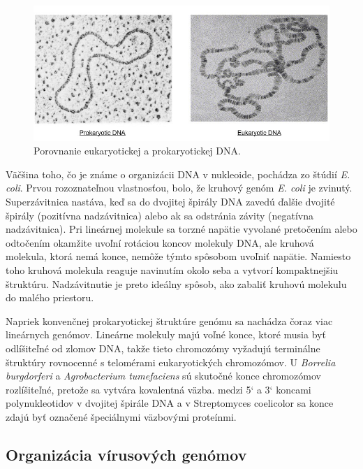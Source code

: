 \begin{figure}[!ht]
	\centering
	\includegraphics[width=\textwidth]{figures/pro-vs-eu-dna_med.jpeg}
	\caption{Porovnanie eukaryotickej a prokaryotickej DNA.\label{o:latex_friendly_zone}}
\end{figure}

Väčšina toho, čo je známe o organizácii DNA v nukleoide, pochádza zo štúdií \textit{E. coli}.
Prvou rozoznateľnou vlastnosťou, bolo, že kruhový genóm \textit{E. coli} je zvinutý.
Superzávitnica nastáva, keď sa do dvojitej špirály DNA zavedú ďalšie dvojité špirály (pozitívna nadzávitnica) alebo ak sa odstránia závity (negatívna nadzávitnica).
Pri lineárnej molekule sa torzné napätie vyvolané pretočením alebo odtočením okamžite uvoľní rotáciou koncov molekuly DNA, ale kruhová molekula, ktorá nemá konce, nemôže týmto spôsobom uvoľniť napätie.
Namiesto toho kruhová molekula reaguje navinutím okolo seba a vytvorí kompaktnejšiu štruktúru.
Nadzávitnutie je preto ideálny spôsob, ako zabaliť kruhovú molekulu do malého priestoru.

Napriek konvenčnej prokaryotickej štruktúre genómu sa nachádza čoraz viac lineárnych genómov.
Lineárne molekuly majú voľné konce, ktoré musia byť odlíšiteľné od zlomov DNA, takže tieto chromozómy vyžadujú terminálne štruktúry rovnocenné s telomérami eukaryotických chromozómov.
U \textit{Borrelia burgdorferi} a \textit{Agrobacterium tumefaciens} sú skutočné konce chromozómov rozlíšiteľné, pretože sa vytvára kovalentná väzba.
medzi 5` a 3` koncami polynukleotidov v dvojitej špirále DNA a v Streptomyces coelicolor sa konce zdajú byť označené špeciálnymi väzbovými proteínmi.

\subsection{Organizácia vírusových genómov}

